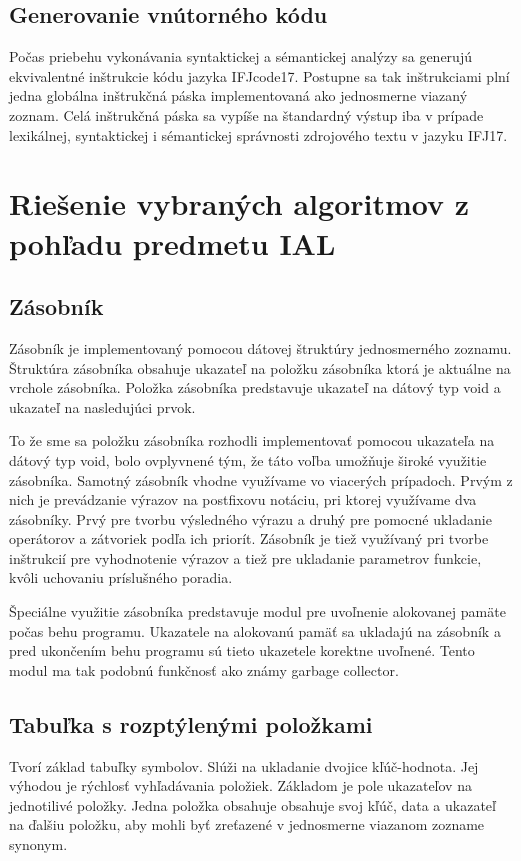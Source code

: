 \documentclass[11pt,a4paper]{article}
\begin{document}
	\subsection{Generovanie vnútorného kódu}

	Počas priebehu vykonávania syntaktickej a sémantickej analýzy sa generujú ekvivalentné inštrukcie kódu jazyka IFJcode17.
	Postupne sa tak inštrukciami plní jedna globálna inštrukčná páska implementovaná ako jednosmerne viazaný zoznam.
	Celá inštrukčná páska sa vypíše na štandardný výstup iba v prípade lexikálnej, syntaktickej i sémantickej správnosti zdrojového textu v jazyku IFJ17.

\section{Riešenie vybraných algoritmov z pohľadu predmetu IAL}
	
	\subsection{Zásobník}
	Zásobník je implementovaný pomocou dátovej štruktúry jednosmerného zoznamu. Štruktúra zásobníka obsahuje ukazateľ na položku zásobníka ktorá je aktuálne na vrchole zásobníka. Položka zásobníka predstavuje ukazateľ na dátový typ void a ukazateľ na nasledujúci prvok.

	To že sme sa položku zásobníka rozhodli implementovať pomocou ukazateľa na dátový typ void, bolo ovplyvnené tým, že táto voľba umožňuje široké využitie zásobníka. Samotný zásobník vhodne využívame vo viacerých prípadoch. Prvým z nich je prevádzanie výrazov na postfixovu notáciu, pri ktorej využívame dva zásobníky. Prvý pre tvorbu výsledného výrazu a druhý pre pomocné ukladanie operátorov a zátvoriek podľa ich priorít. Zásobník je tiež využívaný pri tvorbe inštrukcií pre vyhodnotenie výrazov a tiež pre ukladanie parametrov funkcie, kvôli uchovaniu príslušného poradia.
	
	Špeciálne využitie zásobníka predstavuje modul pre uvoľnenie alokovanej pamäte počas behu programu. Ukazatele na alokovanú pamäť sa ukladajú na zásobník a pred ukončením behu programu sú tieto ukazetele korektne uvoľnené. Tento modul ma tak podobnú funkčnosť ako známy garbage collector.

	\subsection{Tabuľka s rozptýlenými položkami}
	Tvorí základ tabuľky symbolov. Slúži na ukladanie dvojice kľúč-hodnota. Jej výhodou je rýchlosť vyhľadávania položiek. Základom je pole 
	ukazateľov na jednotilivé položky. Jedna položka obsahuje obsahuje svoj kľúč, data a ukazateľ na ďalšiu položku, aby mohli byť zreťazené 
	v jednosmerne viazanom zozname synonym.
\end{document}
